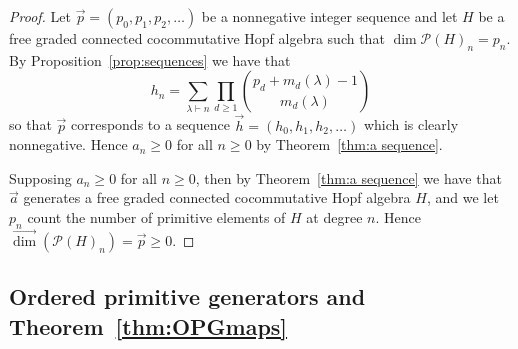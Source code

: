 \documentclass[11pt]{amsart}
\theoremstyle{definition}
\numberwithin{equation}{section}
\newcommand{\vecdim}{\overrightarrow{\dim}}
\newcommand{\felix}[1]{\todo[size=\tiny,color=Cyan]{#1 \\ \hfill --- Félix}}
\begin{document}
\begin{proof}	
    Let \(\vec{p} = (p_0, p_1, p_2, \ldots)\) be a nonnegative integer sequence and let \(H\) be a 
    free graded connected cocommutative Hopf algebra such that \(\dim \mathcal{P}(H)_n = p_n\).
    By Proposition~\ref{prop:sequences} we have that
    \[
        h_n = \sum_{\lambda \vdash n} \prod_{d \geq 1} \binom{p_d + m_d(\lambda) -1}{m_d(\lambda)}
    \]
    so that \(\vec{p}\)  corresponds to a sequence \(\vec{h} = (h_0, h_1, h_2, \ldots)\) which is clearly nonnegative. 
    Hence \(a_n \geq 0\) 
    for all \(n \geq 0\) by Theorem~\ref{thm:a sequence}.

    Supposing \(a_n \geq 0\) for all \(n \geq 0\), then by Theorem~\ref{thm:a sequence} we have that \(\vec{a}\)
    generates a free graded connected
    cocommutative Hopf algebra \(H\), and we let \(p_n\) count the number of primitive elements of \(H\) at degree \(n\).
    Hence \(\vecdim(\mathcal{P}(H)_n) = \vec{p}\geq 0\).

\end{proof} 


\subsection{Ordered primitive generators and Theorem~\ref{thm:OPGmaps}}
\end{document}
